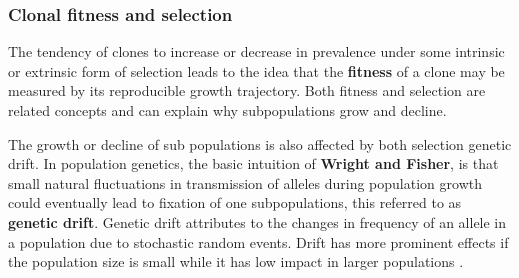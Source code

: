 

\subsubsection{Clonal fitness and selection}
The tendency of clones to increase or decrease in prevalence under some intrinsic or extrinsic form of selection leads to the idea that the \textbf{fitness} of a clone may be measured by its reproducible growth trajectory. 
Both fitness and selection are related concepts and can explain why subpopulations grow and decline. 

The growth or decline of sub populations is also affected by both selection genetic drift. In population genetics, the basic intuition of \textbf{Wright and Fisher}, is that small natural fluctuations in transmission of alleles during population growth could eventually lead to fixation of one subpopulations, this referred to as \textbf{genetic drift}. Genetic drift attributes to the changes in frequency of an allele in a population due to stochastic random events. Drift has more prominent effects if the population size is small while it has low impact in larger populations \cite{lynch2007origins}.




